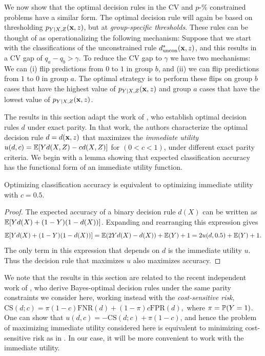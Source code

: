 We now show that the optimal decision rules 
in the CV and $p$-\% constrained problems 
have a similar form.  
The optimal decision rule 
will again be based on thresholding $p_{Y|X, Z}(\vct x,z)$, 
but at \textit{group-specific thresholds}. 
%
These rules can be thought of as operationalizing 
the following mechanism: 
Suppose that we start with the classifications 
of the unconstrained rule $d_{\mathrm{uncon}}^*(\vct x,z)$, 
and this results in a CV gap of $q_a - q_b  > \gamma$.  
To reduce the CV gap to $\gamma$ 
we have two mechanisms: We can
(i)  flip predictions from $0$ to $1$ in group $b$, and (ii) we can flip predictions from $1$ to $0$ in group $a$. 
The optimal strategy is to perform these flips on group $b$ cases that have the highest value of $p_{Y|X, Z}(\vct x,z)$ 
and group $a$ cases that have the lowest value of $p_{Y|X, Z}(\vct x,z)$.

The results in this section adapt the work of \cite{corbett2017algorithmic}, 
who establish optimal decision rules $d$ 
under 
exact parity.
In that work, the authors characterize 
the optimal decision rule $d = d(\vct x, z)$ 
that maximizes the \textit{immediate utility} 
$u(d, c) = \E[Yd(X,Z) - cd(X,Z)]$ for $(0 < c < 1)$,
under different exact parity criteria.  
We begin with a lemma showing 
that expected classification accuracy 
has the functional form 
of an immediate utility function.

\begin{lemma} \label{lemma:accuracy}
Optimizing classification accuracy is equivalent 
to optimizing immediate utility with $c = 0.5$. 
\end{lemma}

\begin{proof}
The expected accuracy of a binary decision rule $d(X)$ 
can be written as $\E[Yd(X) + (1-Y)(1-d(X))]$.  
Expanding and rearranging this expression gives
$$
\E[Yd(X) + (1-Y)(1-d(X))] = \E(2Yd(X) - d(X)) + \E(Y) + 1
	= 2u(d, 0.5) + \E(Y) + 1.
$$
The only term in this expression that depends on $d$ 
is the immediate utility $u$.  
Thus the decision rule that maximizes $u$ 
also maximizes accuracy.
\end{proof}

We note that the results in this section 
are related to the recent independent work 
of \cite{pmlr-v81-menon18a},
who derive Bayes-optimal decision rules 
under the same parity constraints we consider here, 
working instead with the \textit{cost-sensitive risk}, 
$
\mathrm{CS}(d;c) = \pi(1-c)\mathrm{FNR}(d) + (1-\pi)c\mathrm{FPR}(d),
$
where $\pi = \P(Y = 1)$.  
One can show that $u(d, c) = -\mathrm{CS}(d;c) + \pi(1-c)$, 
and hence the problem of maximizing immediate utility considered here 
is equivalent to minimizing cost-sensitive risk 
as in \cite{pmlr-v81-menon18a}.  
In our case, it will be more convenient 
to work with the immediate utility.  

